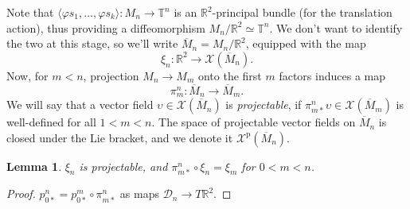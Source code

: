 \documentclass{article}
\def\sD{\mathcal{D}}
\def\RR{\mathbb{R}}
\def\TT{\mathbb{T}}
\def\XX{\mathcal{X}}
\def\p{\mathrm{p}}
\newtheorem{lem}{Lemma}
\theoremstyle{definition}
\begin{document}
Note that $\langle \varphi s_1,\dots,\varphi s_k\rangle : M_n \to \TT^n$ 
is an $\RR^2$-principal bundle (for the translation action), thus providing
a diffeomorphism
$M_n/\RR^2 \simeq \TT^n$. We don't want to identify the two at this stage,
so we'll write $\overline M_n = M_n/\RR^2$, equipped with the map
$$\xi_n:\RR^2 \to \XX(\overline M_n).$$ Now, for $m<n$, projection $M_n\to M_m$ onto 
the first $m$ factors induces a map
$$ \pi^n_m : \overline M_n \to \overline M_m. $$
We will say that a vector field $\upsilon \in \XX(\overline M_n)$ is \emph{projectable},
if $\pi^n_{m*}\upsilon \in \XX(\overline M_m)$ is well-defined for all $1 < m < n$.
The space of projectable vector fields on $\overline M_n$ is closed under the Lie bracket,
and we denote it $\XX^\p(\overline M_n)$.

\begin{lem}\label{lem:xi-proj}
        $\xi_n$ is projectable, and $\pi^n_{m*}\circ\xi_n = \xi_m$ for $0 < m < n$.
\end{lem}
\begin{proof}
        $p^n_{0*} = p^m_{0*} \circ \pi^n_{m*}$ as maps $\sD_n \to T\RR^2$.
\end{proof}
\end{document}
